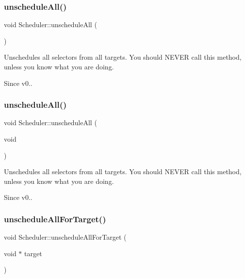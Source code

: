 \subsubsection{\texorpdfstring{unschedule\+All()}{unscheduleAll()}\hspace{0.1cm}{\footnotesize\ttfamily [1/2]}}
{\footnotesize\ttfamily void Scheduler\+::unschedule\+All (\begin{DoxyParamCaption}{ }\end{DoxyParamCaption})}

Unschedules all selectors from all targets. You should N\+E\+V\+ER call this method, unless you know what you are doing. \begin{DoxySince}{Since}
v0.. 
\end{DoxySince}
\mbox{\label{classScheduler_a0746c417a3cf7c794d1ee32969994e6a}} 
\subsubsection{\texorpdfstring{unschedule\+All()}{unscheduleAll()}\hspace{0.1cm}{\footnotesize\ttfamily [2/2]}}
{\footnotesize\ttfamily void Scheduler\+::unschedule\+All (\begin{DoxyParamCaption}\item[{void}]{ }\end{DoxyParamCaption})}

Unschedules all selectors from all targets. You should N\+E\+V\+ER call this method, unless you know what you are doing. \begin{DoxySince}{Since}
v0.. 
\end{DoxySince}
\mbox{\label{classScheduler_a39199385fc1ab4f74c5665beaa2738b6}} 
\subsubsection{\texorpdfstring{unschedule\+All\+For\+Target()}{unscheduleAllForTarget()}\hspace{0.1cm}{\footnotesize\ttfamily [1/2]}}
{\footnotesize\ttfamily void Scheduler\+::unschedule\+All\+For\+Target (\begin{DoxyParamCaption}\item[{void $\ast$}]{target }\end{DoxyParamCaption})}

